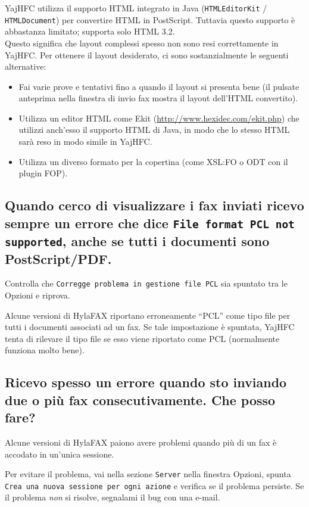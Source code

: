 \documentclass[a4paper,10pt]{scrartcl}
\begin{document}
YajHFC utilizza il supporto HTML integrato in Java (\texttt{HTMLEditorKit} / \texttt{HTMLDocument}) per convertire HTML in PostScript. Tuttavia questo supporto è abbastanza limitato; supporta solo HTML 3.2.\\
Questo significa che layout complessi spesso non sono resi correttamente in YajHFC.
Per ottenere il layout desiderato, ci sono sostanzialmente le seguenti alternative:

\begin{itemize}
 \item Fai varie prove e tentativi fino a quando il layout si presenta bene (il pulsate anteprima nella finestra di invio fax mostra il layout dell'HTML convertito).
 \item Utilizza un editor HTML come Ekit (\url{http://www.hexidec.com/ekit.php}) che utilizzi anch'esso il supporto HTML di Java, in modo che lo stesso HTML sarà reso in modo simile in YajHFC.
 \item Utilizza un diverso formato per la copertina (come XSL:FO o ODT con il plugin FOP).
\end{itemize}

\subsection{Quando cerco di visualizzare i fax inviati ricevo sempre un errore che dice 
   \texttt{File format PCL not supported}, anche se tutti i documenti sono PostScript/PDF.}

Controlla che \texttt{Corregge problema in gestione file PCL} sia spuntato tra le Opzioni e riprova.

Alcune versioni di HylaFAX riportano erroneamente ``PCL'' come tipo file per tutti i documenti
associati ad un fax. Se tale impostazione è spuntata, YajHFC tenta di rilevare il tipo file
se esso viene riportato come PCL (normalmente funziona molto bene).

\subsection{Ricevo spesso un errore quando sto inviando due o più fax consecutivamente. Che posso fare?}

Alcune versioni di HylaFAX paiono avere problemi quando più di un fax è accodato in un'unica sessione.

Per evitare il problema, vai nella sezione \texttt{Server} nella finestra Opzioni, spunta \texttt{Crea una nuova sessione per ogni azione} e verifica se il problema persiste.
Se il problema \emph{non} si risolve, segnalami il bug con una e-mail.
\end{document}
